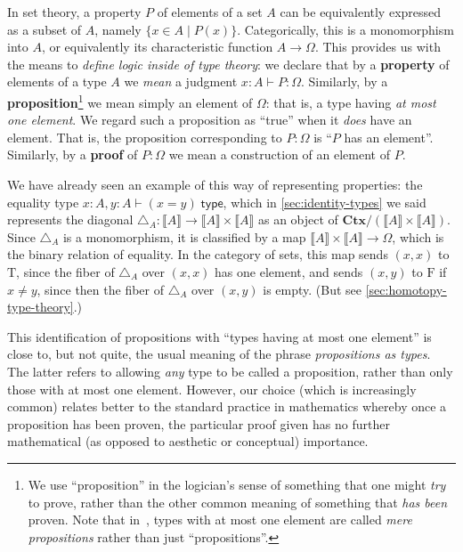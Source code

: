 \documentclass[10pt]{article}
\def\ty{\;\mathsf{type}}
\def\m#1{\llbracket#1\rrbracket}
\def\types{\vdash}
\def\true{\mathrm{T}}
\def\false{\mathrm{F}}
\def\diag{\triangle}
\def\Ctx{\mathbf{Ctx}}
\numberwithin{equation}{section}
\begin{document}

In set theory, a property $P$ of elements of a set $A$ can be equivalently expressed as a subset of $A$, namely $\{ x\in A \mid P(x) \}$.
Categorically, this is a monomorphism into $A$, or equivalently its characteristic function $A\to\Omega$.
This provides us with the means to \emph{define logic inside of type theory}: we declare that by a \textbf{property} of elements of a type $A$ we \emph{mean} a judgment $x:A \types P:\Omega$.
Similarly, by a \textbf{proposition}\footnote{We use ``proposition'' in the logician's sense of something that one might \emph{try} to prove, rather than the other common meaning of something that \emph{has been} proven.
  Note that in~\cite{hottbook}, types with at most one element are called \emph{mere propositions} rather than just ``propositions''.}
we mean simply an element of $\Omega$: that is, a type having \emph{at most one element}.
We regard such a proposition as ``true'' when it \emph{does} have an element.
That is, the proposition corresponding to $P:\Omega$ is ``$P$ has an element''.
Similarly, by a \textbf{proof} of $P:\Omega$ we mean a construction of an element of $P$.

We have already seen an example of this way of representing properties: the equality type $x:A,y:A \types (x=y)\ty$, which
in \cref{sec:identity-types} we said represents the diagonal $\diag_A : \m A \to \m A \times \m A$ as an object of $\Ctx/(\m A \times \m A)$.
Since $\diag_A$ is a monomorphism, it is classified by a map $\m A \times \m A \to \Omega$, which is the binary relation of equality.
In the category of sets, this map sends $(x,x)$ to $\true$, since the fiber of $\diag_A$ over $(x,x)$ has one element, and sends $(x,y)$ to $\false$ if $x\neq y$, since then the fiber of $\diag_A$ over $(x,y)$ is empty.
(But see \cref{sec:homotopy-type-theory}.)

This identification of propositions with ``types having at most one element'' is close to, but not quite, the usual meaning of the phrase \emph{propositions as types}.
The latter refers to allowing \emph{any} type to be called a proposition, rather than only those with at most one element.
However, our choice (which is increasingly common) relates better to the standard practice in mathematics whereby once a proposition has been proven, the particular proof given has no further mathematical (as opposed to aesthetic or conceptual) importance.
\end{document}
